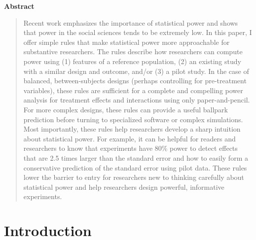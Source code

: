 \documentclass[12pt]{article}
\begin{document}
{\centerline{\textbf{Abstract}}}
\begin{quote}\noindent
Recent work emphasizes the importance of statistical power and shows that power in the social sciences tends to be extremely low. 
In this paper, I offer simple rules that make statistical power more approachable for substantive researchers. 
The rules describe how researchers can compute power using (1) features of a reference population, (2) an existing study with a similar design and outcome, and/or (3) a pilot study.
In the case of balanced, between-subjects designs (perhaps controlling for pre-treatment variables), these rules are sufficient for a complete and compelling power analysis for treatment effects and interactions using only paper-and-pencil. 
For more complex designs, these rules can provide a useful ballpark prediction before turning to specialized software or complex simulations. 
Most importantly, these rules help researchers develop a sharp intuition about statistical power.
For example, it can be helpful for readers and researchers to know that experiments have 80\% power to detect effects that are 2.5 times larger than the standard error and how to easily form a conservative prediction of the standard error using pilot data.
These rules lower the barrier to entry for researchers new to thinking carefully about statistical power and help researchers design powerful, informative experiments.
\end{quote}



\thispagestyle{empty}
\newpage

\doublespace

\setcounter{page}{1}


\section*{Introduction}
\end{document}
